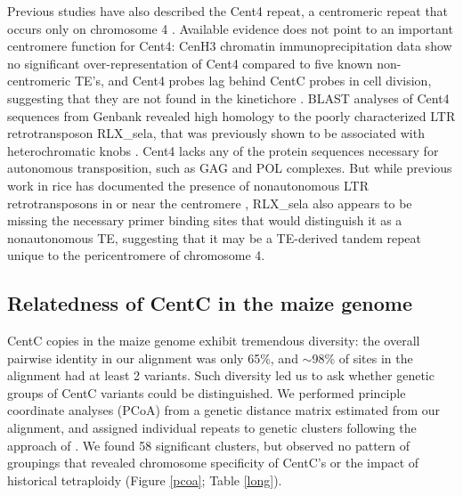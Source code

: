Previous studies have also described the Cent4 repeat, a centromeric repeat that occurs only on chromosome 4 \citep{Page2001}. 
Available evidence does not point to an important centromere function for Cent4: CenH3 chromatin immunoprecipitation data \citep{Wolfgruber2009} show no significant over-representation of Cent4 compared to five known non-centromeric TE’s, and Cent4 probes lag behind CentC probes in cell division, suggesting that they are not found in the kinetichore \citep{Jiang2002}.  
BLAST analyses of Cent4 sequences from Genbank revealed high homology to the poorly characterized LTR retrotransposon RLX\_sela, that was previously shown to be associated with heterochromatic  knobs \citep{Tenaillon2011, Chia2012}.  
Cent4 lacks any of the protein sequences necessary for autonomous transposition, such as GAG and POL complexes.  
But while previous work in rice has documented the presence of nonautonomous LTR retrotransposons  in or near the centromere \citep{Jiang2002}, RLX\_sela also appears to be missing the necessary primer binding sites that would distinguish it as a nonautonomous TE, suggesting that it may be a TE-derived tandem repeat unique to the pericentromere of chromosome 4. 

\subsection*{Relatedness of CentC in the maize genome}

CentC copies in the maize genome exhibit tremendous diversity: the overall pairwise identity in our alignment was only 65\%, and $\sim$98\% of sites in the alignment had at least 2 variants.  Such diversity led us to ask whether genetic groups of CentC variants could be distinguished. We performed principle coordinate analyses (PCoA) from a genetic distance matrix estimated from our alignment, and assigned individual repeats to  genetic clusters following the approach of \citet{Patterson2006}.  We found 58 significant clusters, but observed no pattern of groupings that revealed chromosome specificity of CentC’s or the impact of historical tetraploidy (Figure \ref{pcoa}; Table \ref{long}).

